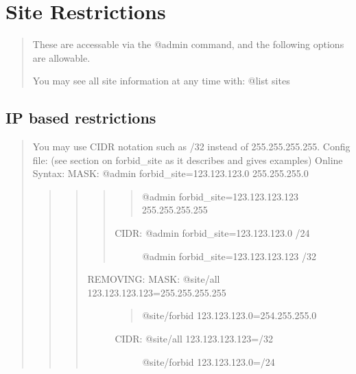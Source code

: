 \documentclass[letterpaper,10pt,english]{sphinxmanual}
\begin{document}
\section{Site Restrictions}
\label{\detokenize{08-lockdown:site-restrictions}}\begin{quote}

\sphinxAtStartPar
These are accessable via the @admin command, and the following options are
allowable.

\sphinxAtStartPar
You may see all site information at any time with: @list sites
\end{quote}


\subsection{IP based restrictions}
\label{\detokenize{08-lockdown:ip-based-restrictions}}\begin{quote}

\sphinxAtStartPar
You may use CIDR notation such as /32 instead of 255.255.255.255.
Config file:  (see section on forbid\_site as it describes and gives examples)
Online Syntax: MASK: @admin forbid\_site=123.123.123.0 255.255.255.0
\begin{quote}
\begin{quote}
\begin{quote}
\begin{quote}

\sphinxAtStartPar
@admin forbid\_site=123.123.123.123 255.255.255.255
\end{quote}
\begin{description}
\item[{CIDR: @admin forbid\_site=123.123.123.0 /24}] \leavevmode
\sphinxAtStartPar
@admin forbid\_site=123.123.123.123 /32

\end{description}
\end{quote}
\begin{description}
\item[{REMOVING: MASK: @site/all 123.123.123.123=255.255.255.255}] \leavevmode\begin{quote}

\sphinxAtStartPar
@site/forbid 123.123.123.0=254.255.255.0
\end{quote}
\begin{description}
\item[{CIDR: @site/all 123.123.123.123=/32}] \leavevmode
\sphinxAtStartPar
@site/forbid 123.123.123.0=/24


\end{description}
\end{description}
\end{quote}
\end{quote}
\end{quote}
\end{document}
